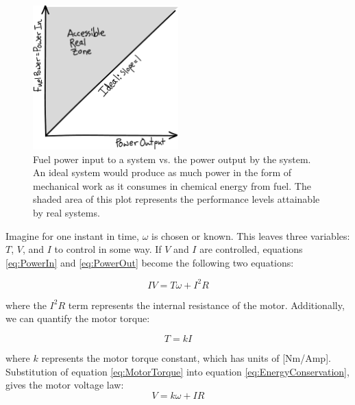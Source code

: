 \begin{figure}[h]		%
\begin{centering}
\includegraphics[width=0.5\textwidth]{Figures/IdealPowerPlotSketch}\par
\end{centering}
\caption[Plot: Power Conservation]{Fuel power input to a system vs. the power output by the system. An ideal system would produce as much power in the form of mechanical work as it consumes in chemical energy from fuel. The shaded area of this plot represents the performance levels attainable by real systems.}
\label{fig:IdealPowerPlotSketch}
\end{figure}

Imagine for one instant in time, $\omega$ is chosen or known. This leaves three variables: $T$, $V$, and $I$ to control in some way. If $V$ and $I$ are controlled, equations \ref{eq:PowerIn} and \ref{eq:PowerOut} become the following two equations:

\begin{equation}
IV = T\omega + I^2R
\label{eq:EnergyConservation}
\end{equation}

where the $I^2R$ term represents the internal resistance of the motor. Additionally, we can quantify the motor torque:

\begin{equation}
T = kI
\label{eq:MotorTorque}
\end{equation}

where $k$ represents the motor torque constant, which has units of [Nm/Amp]. Substitution of equation \ref{eq:MotorTorque} into equation \ref{eq:EnergyConservation}, gives the motor voltage law:
\begin{equation}
V = k\omega + IR
\label{eq:MotorVoltage}
\end{equation}

